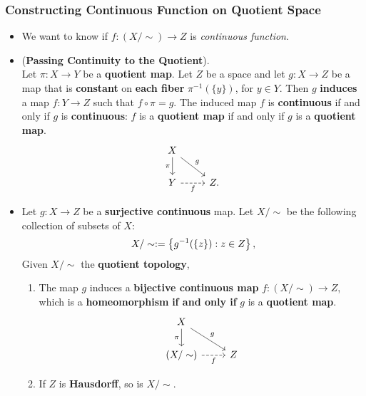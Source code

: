 \documentclass[11pt]{article}
\begin{document}
\subsubsection{Constructing Continuous Function on Quotient Space}
\begin{itemize}
\item We want to know if $f: (X/\sim) \rightarrow Z$ is \emph{continuous function}. 

\item \begin{theorem}  (\textbf{Passing Continuity to the Quotient}). \citep{munkres2000topology}\\
Let $\pi: X \rightarrow Y$ be a \textbf{quotient map}. Let $Z$ be a space and let $g : X \rightarrow Z$ be a map that is \textbf{constant} on \textbf{each fiber}  $\pi^{-1}(\{y\})$, for $y \in Y$. Then $g$ \textbf{induces} a map $f: Y \rightarrow Z$ such that $f \circ \pi = g$. The induced map $f$ is \textbf{continuous} if and only
if $g$ is \textbf{continuous}: $f$ is a \textbf{quotient map} if and only if $g$ is a \textbf{quotient map}.
\[
  \begin{tikzcd}
     X  \arrow[swap]{d}{\pi} \arrow[dr, "g"]  & \\
     Y   \arrow[r, swap, dashed,  "f"]  & Z.
  \end{tikzcd}
\] 
\end{theorem}

\item \begin{corollary}
Let $g : X \rightarrow Z$ be a \textbf{surjective continuous} map. Let $X/\sim$ be the following collection of subsets of $X$:
\begin{align*}
X/\sim := \left\{g^{-1}(\{z\}): z \in Z \right\},
\end{align*}
Given $X/\sim$ the \textbf{quotient topology},
\begin{enumerate}
\item The map $g$ induces a \textbf{bijective continuous map} $f : (X/\sim) \rightarrow Z$, which is a \textbf{homeomorphism} \textbf{if and only if} $g$ is a \textbf{quotient map}.
\[
  \begin{tikzcd}
     X  \arrow[swap]{d}{\pi} \arrow[dr, "g"]  & \\
     (X/\sim)   \arrow[r, swap, dashed,  "f"]  & Z
  \end{tikzcd}
\] 
\item If $Z$ is \textbf{Hausdorff}, so is $X/\sim$.
\end{enumerate}

\end{corollary}
\end{itemize}
\end{document}
